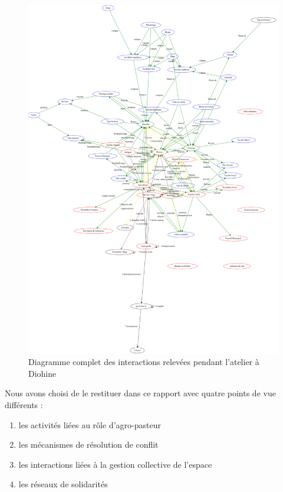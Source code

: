 \begin{figure}
  \begin{center}
  \includegraphics[width=15cm]{img/pardi_fdp.png}
  \end{center}
  \caption{Diagramme complet des interactions relevées pendant l'atelier à Diohine }
  \label{diagComplet}
\end{figure}

Nous avons choisi de le restituer dans ce rapport avec quatre points de vue différents :
\begin{enumerate}
  \item les activités liées au rôle d'agro-pasteur
  \item les mécanismes de résolution de conflit
  \item les interactions liées à la gestion collective de l'espace
  \item les réseaux de solidarités
\end{enumerate}
